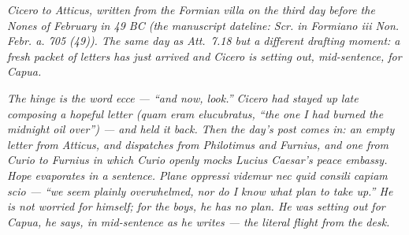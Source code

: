 
\textit{Cicero to Atticus, written from the Formian villa
on the third day before the Nones of February in 49 BC
(the manuscript dateline: \textit{Scr. in Formiano iii
Non. Febr. a. 705 (49)}). The same day as Att.~7.18 but
a different drafting moment: a fresh packet of letters
has just arrived and Cicero is setting out, mid-sentence,
for Capua.}

\textit{The hinge is the word \emph{ecce} --- ``and now,
look.'' Cicero had stayed up late composing a hopeful
letter (\emph{quam eram elucubratus}, ``the one I had
burned the midnight oil over'') --- and held it back.
Then the day's post comes in: an empty letter from
Atticus, and dispatches from Philotimus and Furnius,
and one from Curio to Furnius in which Curio openly
mocks Lucius Caesar's peace embassy. Hope evaporates
in a sentence. \emph{Plane oppressi videmur nec quid
consili capiam scio} --- ``we seem plainly overwhelmed,
nor do I know what plan to take up.'' He is not worried
for himself; for the boys, he has no plan. He was
setting out for Capua, he says, in mid-sentence as he
writes --- the literal flight from the desk.}
